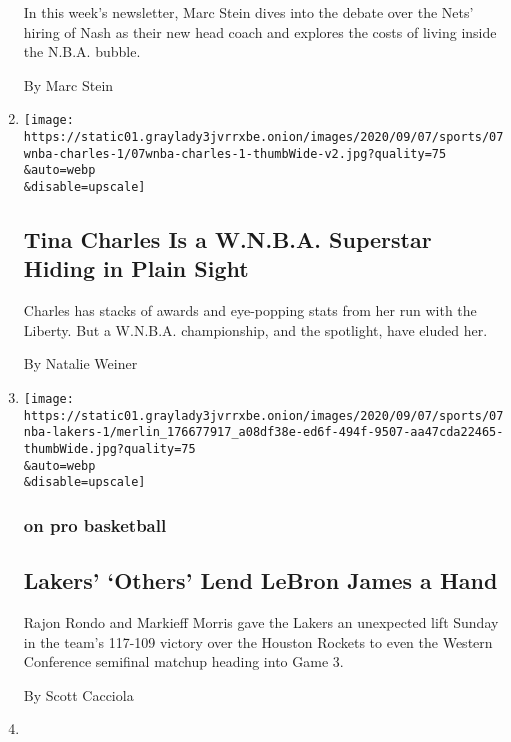 \begin{enumerate}
  In this week's newsletter, Marc Stein dives into the debate over the
  Nets' hiring of Nash as their new head coach and explores the costs of
  living inside the N.B.A. bubble.

  By Marc Stein
\item
  \href{/2020/09/08/sports/basketball/tina-charles-liberty-mystics-wnba.html}{}

  \texttt{[image: https://static01.graylady3jvrrxbe.onion/images/2020/09/07/sports/07wnba-charles-1/07wnba-charles-1-thumbWide-v2.jpg?quality=75\\\&auto=webp\\\&disable=upscale]}

  \hypertarget{tina-charles-is-a-wnba-superstar-hiding-in-plain-sight}{%
  \subsection{Tina Charles Is a W.N.B.A. Superstar Hiding in Plain
  Sight}\label{tina-charles-is-a-wnba-superstar-hiding-in-plain-sight}}

  Charles has stacks of awards and eye-popping stats from her run with
  the Liberty. But a W.N.B.A. championship, and the spotlight, have
  eluded her.

  By Natalie Weiner
\item
  \href{/2020/09/07/sports/basketball/lakers-vs-rockets-score-game-2.html}{}

  \texttt{[image: https://static01.graylady3jvrrxbe.onion/images/2020/09/07/sports/07nba-lakers-1/merlin\_176677917\_a08df38e-ed6f-494f-9507-aa47cda22465-thumbWide.jpg?quality=75\\\&auto=webp\\\&disable=upscale]}

  \hypertarget{on-pro-basketball}{%
  \subsubsection{on pro basketball}\label{on-pro-basketball}}

  \hypertarget{lakers-others-lend-lebron-james-a-hand}{%
  \subsection{Lakers' `Others' Lend LeBron James a
  Hand}\label{lakers-others-lend-lebron-james-a-hand}}

  Rajon Rondo and Markieff Morris gave the Lakers an unexpected lift
  Sunday in the team's 117-109 victory over the Houston Rockets to even
  the Western Conference semifinal matchup heading into Game 3.

  By Scott Cacciola
\item
  \href{/2020/09/06/sports/basketball/bucks-heat-nba-playoffs.html}{}


\end{enumerate}
